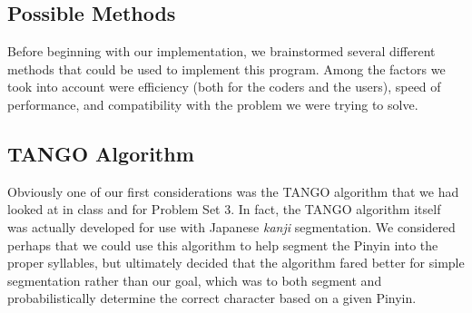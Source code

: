 \documentclass[11pt, twocolumn]{article}
\makeatletter
\newenvironment{problem x}{\@startsection
       {section}
       {1}
       {-.2em}
       {-3.5ex plus -1ex minus -.2ex}
       {2.3ex plus .2ex}
       {\pagebreak[3] %
       \large\bf\noindent{Problem }
       }
       }
       {%
       \begin{center}\large\bf \ldots\ldots\ldots\end{center}}
\makeatother
\begin{document}
\subsection*{Possible Methods}
Before beginning with our implementation, we brainstormed several different methods that could be used to implement this program. Among the factors we took into account were efficiency (both for the coders and the users), speed of performance, and compatibility with the problem we were trying to solve.
\subsection{TANGO Algorithm}
Obviously one of our first considerations was the TANGO algorithm that we had looked at in class and for Problem Set 3. In fact, the TANGO algorithm itself was actually developed for use with Japanese \emph{kanji} segmentation. We considered perhaps that we could use this algorithm to help segment the Pinyin into the proper syllables, but ultimately decided that the algorithm fared better for simple segmentation rather than our goal, which was to both segment and probabilistically determine the correct character based on a given Pinyin.
\end{document}
